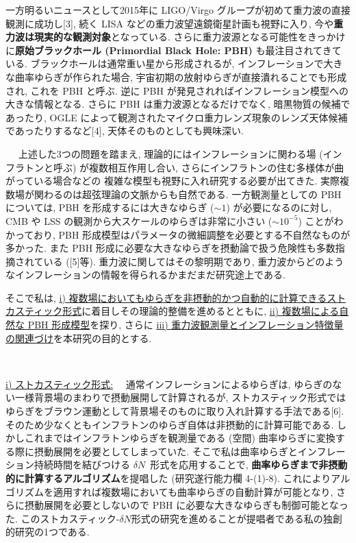 \documentclass[11pt,a4paper,uplatex,twoside,dvipdfmx]{ujarticle} 	%
\renewcommand{\emph}[1]{{\sffamily\gtfamily\bfseries #1}}
\newcommand{\subject}[1]{\noindent{\sffamily\gtfamily\bfseries #1}~~}
\newcommand{\subsubject}[1]{\noindent \ul{#1}~~}
\newcommand{\研究課題名}{\mgfamily ストカスティック形式、原始ブラックホール、重力波観測から迫るインフレーション}
\newcommand{\研究機関名}{\mgfamily 名古屋大学}
\newcommand{\申請者氏名}{\mgfamily 多田 祐一郎}
\newcommand{\研究代表者氏名}{\申請者氏名}
\newcommand{\研究期間の最終元号年度}{34}	%
\begin{document}
{	一方明るいニュースとして2015年に LIGO/Virgo グループが初めて重力波の直接観測に成功し[3],
	続く LISA などの重力波望遠鏡衛星計画も視野に入り, 今や\emph{重力波は現実的な観測対象}となっている.
	さらに重力波源となる可能性をきっかけに\emph{原始ブラックホール (Primordial Black Hole: PBH)} も最注目されてきている.
	ブラックホールは通常重い星から形成されるが, インフレーションで大きな曲率ゆらぎが作られた場合, 宇宙初期の放射ゆらぎが直接潰れることでも形成され, これを PBH と呼ぶ.
	逆に PBH が発見されればインフレーション模型への大きな情報となる. 
	さらに PBH は重力波源となるだけでなく, 暗黒物質の候補であったり, OGLE によって観測されたマイクロ重力レンズ現象のレンズ天体候補であったりするなど[4],
	天体そのものとしても興味深い.
	
	
	
	\vspace{3pt}
	\subject{2. 問題点および解決方策}
	上述した3つの問題を踏まえ, 理論的にはインフレーションに関わる場 (インフラトンと呼ぶ) が複数相互作用し合い, さらにインフラトンの住む多様体が曲がっている場合などの
	複雑な模型も視野に入れ研究する必要が出てきた. 実際複数場が関わるのは超弦理論の文脈からも自然である.
	一方観測量としての PBH については, PBH を形成するには大きなゆらぎ ($\sim1$) が必要になるのに対し, CMB や LSS の観測から大スケールのゆらぎは非常に小さい ($\sim10^{-5}$) ことがわかっており,
	PBH 形成模型はパラメータの微細調整を必要とする不自然なものが多かった.
	また PBH 形成に必要な大きなゆらぎを摂動論で扱う危険性も多数指摘されている ([5]等).
	重力波に関してはその黎明期であり, 重力波からどのようなインフレーションの情報を得られるかまだまだ研究途上である.
	
	そこで私は, \ul{i) 複数場においてもゆらぎを非摂動的かつ自動的に計算できるストカスティック形式}に着目しその理論的整備を進めるとともに,
	\ul{ii) 複数場による自然な PBH 形成模型}を探り, さらに \ul{iii) 重力波観測量とインフレーション特徴量の関連づけ}を本研究の目的とする.
	
	
	\vspace{3pt}
	\subject{3. 研究目的・方法および独創性}
	
	\subsubject{i) ストカスティック形式:}
	通常インフレーションによるゆらぎは, ゆらぎのない一様背景場のまわりで摂動展開して計算されるが,
	ストカスティック形式ではゆらぎをブラウン運動として背景場そのものに取り入れ計算する手法である[6]. 
	そのため少なくともインフラトンのゆらぎ自体は非摂動的に計算可能である.
	しかしこれまではインフラトンゆらぎを観測量である (空間) 曲率ゆらぎに変換する際に摂動展開を必要としてしまっていた.
	そこで私は曲率ゆらぎとインフレーション持続時間を結びつける $\delta N$~形式を応用することで,
	\emph{曲率ゆらぎまで非摂動的に計算するアルゴリズム}を提唱した (研究遂行能力欄 4-(1)-8).
	これによりアルゴリズムを適用すれば複数場においても曲率ゆらぎの自動計算が可能となり,
	さらに摂動展開を必要としないので PBH に必要な大きなゆらぎも制御可能となった.
	このストカスティック-$\delta N$形式の研究を進めることが提唱者である私の独創的研究の1つである.
	
}
\end{document}
